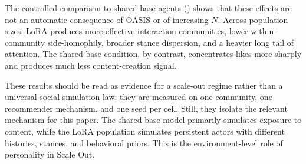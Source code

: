 \begin{table}[tbp]
\centering
\small
\setlength{\tabcolsep}{6pt}
\renewcommand{\arraystretch}{1.20}
\caption{Controlled comparison between per-user LoRA and shared-base agents. Values above one indicate a LoRA advantage for ratios, while negative values indicate lower side-homophily under LoRA.}
\label{tab:oasis-lora-base-comparison}
\end{table}

The controlled comparison to shared-base agents () shows that these effects are not an automatic consequence of OASIS or of increasing \(N\). Across population sizes, LoRA produces more effective interaction communities, lower within-community side-homophily, broader stance dispersion, and a heavier long tail of attention. The shared-base condition, by contrast, concentrates likes more sharply and produces much less content-creation signal.

These results should be read as evidence for a scale-out regime rather than a universal social-simulation law: they are measured on one community, one recommender mechanism, and one seed per cell. Still, they isolate the relevant mechanism for this paper. The shared base model primarily simulates exposure to content, while the LoRA population simulates persistent actors with different histories, stances, and behavioral priors. This is the environment-level role of personality in Scale Out.


